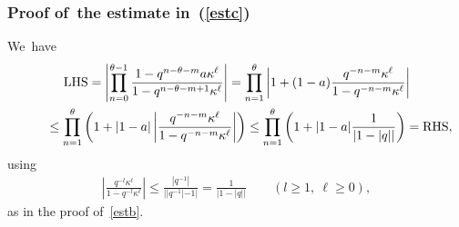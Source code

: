 \subsubsection[Proof of~the estimate in (B.7)]{Proof of~the estimate in~(\ref{estc})}
We~have
\begin{gather*}
\text{LHS} = \left| \prod_{n=0}^{\theta-1} \frac{1- q^{n-\theta-m}a\kappa^\ell }{1-q^{n-\theta-m+1} \kappa^\ell } \right| = \prod_{n=1}^{\theta}\left| 1+(1-a)\frac{q^{-n-m}\kappa^\ell}{1-q^{-n-m}\kappa^\ell}\right|
\\ \hphantom{\text{LHS}}
{}\leq \prod_{n=1}^{\theta}\left( 1+|1-a|\left|\frac{q^{-n-m}\kappa^\ell}{1-q^{-n-m}\kappa^\ell}\right|\right)
\leq \prod_{n=1}^{\theta}\left( 1+|1-a|\frac{1}{|1-|q||}\right) =\text{RHS},
\end{gather*}
using
\begin{gather*}
\left|\frac{q^{-l}\kappa^\ell}{1-q^{-l}\kappa^\ell}\right|\leq \frac{|q^{-1}|}{||q^{-1}|-1|} = \frac{1}{|1-|q||} \qquad
(l\geq 1,\ \ell\geq 0),
\end{gather*}
as in the proof of~\eqref{estb}.

